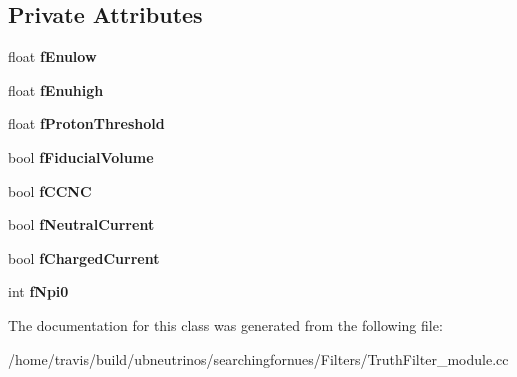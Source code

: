 \subsection*{Private Attributes}
\begin{DoxyCompactItemize}
\item 
float {\bfseries f\+Enulow}\hypertarget{classTruthFilter_a17edb6af974475826b0a8b9e18c289e8}{}\label{classTruthFilter_a17edb6af974475826b0a8b9e18c289e8}

\item 
float {\bfseries f\+Enuhigh}\hypertarget{classTruthFilter_a982d272becaf972f8f39a9735762d58d}{}\label{classTruthFilter_a982d272becaf972f8f39a9735762d58d}

\item 
float {\bfseries f\+Proton\+Threshold}\hypertarget{classTruthFilter_a9dd14e4912aeaea0871aa1683bdfd4b5}{}\label{classTruthFilter_a9dd14e4912aeaea0871aa1683bdfd4b5}

\item 
bool {\bfseries f\+Fiducial\+Volume}\hypertarget{classTruthFilter_a0dcfc4bfb7d01bf7290bd0cb0d531659}{}\label{classTruthFilter_a0dcfc4bfb7d01bf7290bd0cb0d531659}

\item 
bool {\bfseries f\+C\+C\+NC}\hypertarget{classTruthFilter_a69b68c339f5b958a436bb370842f6880}{}\label{classTruthFilter_a69b68c339f5b958a436bb370842f6880}

\item 
bool {\bfseries f\+Neutral\+Current}\hypertarget{classTruthFilter_a1896a896e527f01cdaf57d9fd2a70d6f}{}\label{classTruthFilter_a1896a896e527f01cdaf57d9fd2a70d6f}

\item 
bool {\bfseries f\+Charged\+Current}\hypertarget{classTruthFilter_a9063ad664e9c091c25b719a4e492c965}{}\label{classTruthFilter_a9063ad664e9c091c25b719a4e492c965}

\item 
int {\bfseries f\+Npi0}\hypertarget{classTruthFilter_a8ae8363120360281655b37ffbce3ac66}{}\label{classTruthFilter_a8ae8363120360281655b37ffbce3ac66}

\end{DoxyCompactItemize}


The documentation for this class was generated from the following file\+:\begin{DoxyCompactItemize}
\item 
/home/travis/build/ubneutrinos/searchingfornues/\+Filters/Truth\+Filter\+\_\+module.\+cc\end{DoxyCompactItemize}

